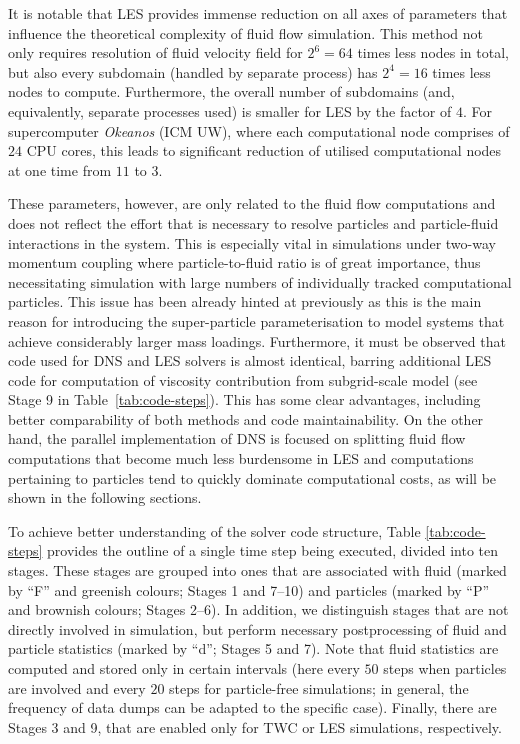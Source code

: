 \documentclass{pracamgren}
\begin{document}
It is notable that LES provides immense reduction on all axes of parameters that influence the theoretical complexity of fluid flow simulation.
This method not only requires resolution of fluid velocity field for ${2^6 = 64}$ times less nodes in total, but also every subdomain (handled by separate process) has ${2^4 = 16}$ times less nodes to compute.
Furthermore, the overall number of subdomains (and, equivalently, separate processes used) is smaller for LES by the factor of $4$.
For supercomputer \emph{Okeanos} (ICM UW), where each computational node comprises of $24$ CPU cores, this leads to significant reduction of utilised computational nodes at one time from $11$ to $3$.

These parameters, however, are only related to the fluid flow computations and does not reflect the effort that is necessary to resolve particles and particle-fluid interactions in the system.
This is especially vital in simulations under two-way momentum coupling where particle-to-fluid ratio is of great importance, thus necessitating simulation with large numbers of individually tracked computational particles.
This issue has been already hinted at previously as this is the main reason for introducing the super-particle parameterisation to model systems that achieve considerably larger mass loadings.
Furthermore, it must be observed that code used for DNS and LES solvers is almost identical, barring additional LES code for computation of viscosity contribution from subgrid-scale model (see Stage 9 in Table~\ref{tab:code-steps}).
This has some clear advantages, including better comparability of both methods and code maintainability.
On the other hand, the parallel implementation of DNS is focused on splitting fluid flow computations that become much less burdensome in LES and computations pertaining to particles tend to quickly dominate computational costs, as will be shown in the following sections.

\medskip

To achieve better understanding of the solver code structure, Table \ref{tab:code-steps} provides the outline of a single time step being executed, divided into ten stages.
These stages are grouped into ones that are associated with fluid (marked by ``F'' and greenish colours; Stages 1 and 7--10) and particles (marked by ``P'' and brownish colours; Stages 2--6).
In addition, we distinguish stages that are not directly involved in simulation, but perform necessary postprocessing of fluid and particle statistics (marked by ``d''; Stages 5 and 7).
Note that fluid statistics are computed and stored only in certain intervals (here every $50$ steps when particles are involved and every $20$ steps for particle-free simulations; in general, the frequency of data dumps can be adapted to the specific case).
Finally, there are Stages 3 and 9, that are enabled only for TWC or LES simulations, respectively.
\end{document}
